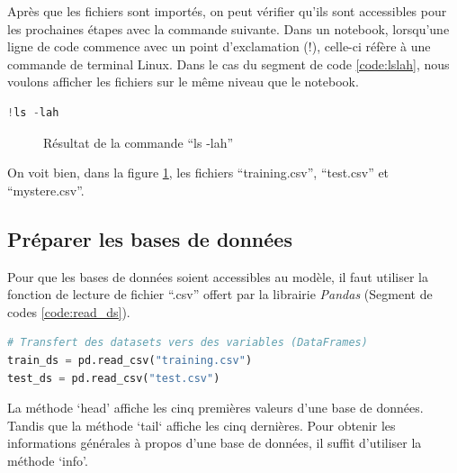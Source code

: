 \documentclass{article}
\begin{document}
Après que les fichiers sont importés, on peut vérifier qu'ils sont accessibles pour les prochaines étapes avec la commande suivante. Dans un notebook, lorsqu'une ligne de code commence avec un point d'exclamation (!), celle-ci réfère à une commande de terminal Linux. Dans le cas du segment de code \ref{code:lslah}, nous voulons afficher les fichiers sur le même niveau que le notebook.
\medbreak

\begin{lstlisting}[language=Python, caption={Voir les fichiers disponibles pour le notebook}, label={code:lslah}]
!ls -lah
\end{lstlisting}

\begin{figure}[H]
  \centering
  \caption{Résultat de la commande ``ls -lah''}
  \label{fig:lslah}
\end{figure}

On voit bien, dans la figure \ref{fig:lslah}, les fichiers ``training.csv'', ``test.csv'' et ``mystere.csv''.

\subsection{Préparer les bases de données}
Pour que les bases de données soient accessibles au modèle, il faut utiliser la fonction de lecture de fichier ``.csv'' offert par la librairie \textit{Pandas} (Segment de codes \ref{code:read_ds}).
\smallbreak
\begin{lstlisting}[language=Python, caption={Lire les bases de données}, label={code:read_ds}]
# Transfert des datasets vers des variables (DataFrames)
train_ds = pd.read_csv("training.csv")
test_ds = pd.read_csv("test.csv")
\end{lstlisting}

La méthode `head' affiche les cinq premières valeurs d'une base de données. Tandis que la méthode `tail` affiche les cinq dernières. Pour obtenir les informations générales à propos d'une base de données, il suffit d'utiliser la méthode `info'.
\smallbreak
\end{document}
